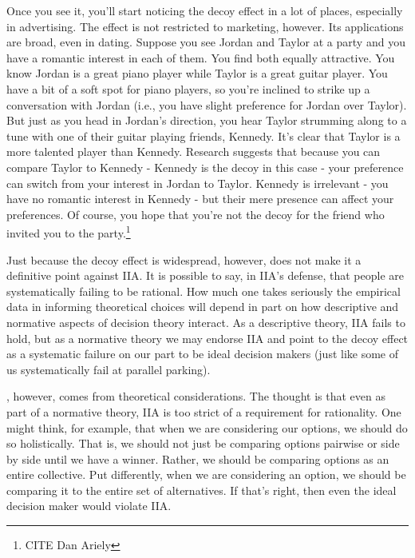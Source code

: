 \documentclass[]{tufte-book}
\begin{document}
Once you see it, you'll start noticing the decoy effect in a lot of places, especially in advertising. The effect is not restricted to marketing, however. Its applications are broad, even in dating. Suppose you see Jordan and Taylor at a party and you have a romantic interest in each of them. You find both equally attractive. You know Jordan is a great piano player while Taylor is a great guitar player. You have a bit of a soft spot for piano players, so you're inclined to strike up a conversation with Jordan (i.e., you have slight preference for Jordan over Taylor). But just as you head in Jordan's direction, you hear Taylor strumming along to a tune with one of their guitar playing friends, Kennedy. It's clear that Taylor is a more talented player than Kennedy. Research suggests that because you can compare Taylor to Kennedy - Kennedy is the decoy in this case - your preference can switch from your interest in Jordan to Taylor. Kennedy is irrelevant - you have no romantic interest in Kennedy - but their mere presence can affect your preferences. Of course, you hope that you're not the decoy for the friend who invited you to the party.\footnote{CITE Dan Ariely}

Just because the decoy effect is widespread, however, does not make it a definitive point against IIA. It is possible to say, in IIA's defense, that people are systematically failing to be rational. How much one takes seriously the empirical data in informing theoretical choices will depend in part on how descriptive and normative aspects of decision theory interact. As a descriptive theory, IIA fails to hold, but as a normative theory we may endorse IIA and point to the decoy effect as a systematic failure on our part to be ideal decision makers (just like some of us systematically fail at parallel parking).

, however, comes from theoretical considerations. The thought is that even as part of a normative theory, IIA is too strict of a requirement for rationality. One might think, for example, that when we are considering our options, we should do so holistically. That is, we should not just be comparing options pairwise or side by side until we have a winner. Rather, we should be comparing options as an entire collective. Put differently, when we are considering an option, we should be comparing it to the entire set of alternatives. If that's right, then even the ideal decision maker would violate IIA.
\end{document}
